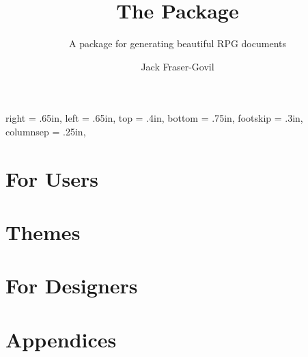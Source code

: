 \documentclass[theme=default,justified,oneside,columns=1]{rpgbook}
\title{The \rpgtex{} Package}
\subtitle{A package for generating beautiful RPG documents}
\author{Jack Fraser-Govil}
\begin{document}
	\frontmatter
	\maketitle{}

	
	\tableofcontents


	\newgeometry
	{
		right   = .65in, %
		left	= .65in,
		top       = .4in, %
		bottom    = .75in,  %
		footskip  = .3in, %
		columnsep = .25in, %
	}

	\mainmatter{}
	

	\part[img/the_writing_desk_2015.19.1530.jpg]{\rpgtex{} For Users}\label{P:Users}
		
		
		
		
	\part[img/costume_1943.8.9509.jpg]{\rpgtex{} Themes}\label{P:Themes}
		
		
		
		
		\newpage
	\part[img/desk_1943.8.5338]{\rpgtex{} For Designers}\label{P:Designers}
		
		
		
		
		

	\part{Appendices}
		\appendix
		
		
		
		
		{\footnotesize\tt
			\printindex
		}
\end{document}
